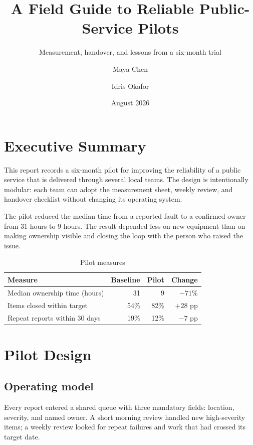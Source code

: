 \documentclass{erdc}
\title{A Field Guide to Reliable Public-Service Pilots}
\subtitle{Measurement, handover, and lessons from a six-month trial}
\date{August 2026}
\author{Maya Chen \and Idris Okafor}
\affiliation{Northbridge Research Unit\\
  14 Meridian Square\\
  Northbridge NB4 2QJ}
\begin{document}
\frontmatter
\let\erdcOriginalIncludegraphics\includegraphics
\renewcommand{\includegraphics}[2][]{\rule{65pt}{40pt}}
\maketitle
\let\includegraphics\erdcOriginalIncludegraphics
\tableofcontents
\listoffiguresandtables

\chapter{Executive Summary}

This report records a six-month pilot for improving the reliability of a public
service that is delivered through several local teams. The design is intentionally
modular: each team can adopt the measurement sheet, weekly review, and handover
checklist without changing its operating system.

The pilot reduced the median time from a reported fault to a confirmed owner from
31 hours to 9 hours. The result depended less on new equipment than on making
ownership visible and closing the loop with the person who raised the issue.

\begin{table}[ht]
  \centering
  \caption{Pilot measures}
  \begin{tabular}{@{}lrrr@{}}
    \toprule
    Measure & Baseline & Pilot & Change \\
    \midrule
    Median ownership time (hours) & 31 & 9 & $-71\%$ \\
    Items closed within target & 54\% & 82\% & $+28$ pp \\
    Repeat reports within 30 days & 19\% & 12\% & $-7$ pp \\
    \bottomrule
  \end{tabular}
\end{table}

\chapter{Pilot Design}
\section{Operating model}

Every report entered a shared queue with three mandatory fields: location,
severity, and named owner. A short morning review handled new high-severity
items; a weekly review looked for repeat failures and work that had crossed its
target date.
\end{document}
